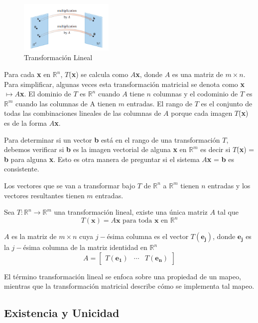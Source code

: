 \documentclass{article}
\begin{document}
\begin{figure}[ht]
    \centerline{\includegraphics[width=0.4\textwidth]{image16.png}}
    \caption{Transformación Lineal}
  \end{figure}

Para cada \textbf{x} en $\mathbb{R}^n$, $T$(\textbf{x}) se calcula como $A$\textbf{x}, donde $A$ es una matriz de $m \times n$. Para simplificar, algunas veces esta transformación matricial se denota como \textbf{x} $\longmapsto A$\textbf{x}. El dominio de $T$ es $\mathbb{R}^n$ cuando $A$ tiene $n$ columnas y el codominio de $T$ es $\mathbb{R}^m$ cuando las columnas de A tienen $m$ entradas. El rango de $T$ es el conjunto de todas las combinaciones lineales de las columnas de $A$ porque cada imagen $T$(\textbf{x}) es de la forma $A$\textbf{x}.

Para determinar si un vector \textbf{b} está en el rango de una transformación $T$, debemos verificar si \textbf{b} es la imagen vectorial de alguna \textbf{x} en $\mathbb{R}^m$ es decir si $T$(\textbf{x}) = \textbf{b} para alguna \textbf{x}. Esto es otra manera de preguntar si el sistema $A$\textbf{x} = \textbf{b} es consistente.

Los vectores que se van a transformar bajo $T$ de $\mathbb{R}^n$ a $\mathbb{R}^m$ tienen $n$ entradas y los vectores resultantes tienen $m$ entradas.

Sea $T: \mathbb{R}^n \rightarrow \mathbb{R}^m$ una transformación lineal, existe una única matriz $A$ tal que $$T(\mathbf{x}) = A\mathbf{x} \text{ para toda } \textbf{x} \text{ en } \mathbb{R}^n$$
    
$A$ es la matriz de $m \times n$ cuya $j-$ésima columna es el vector $T(\mathbf{e_j})$, donde $\mathbf{e_j}$ es la $j-$ésima columna de la matriz identidad en $\mathbb{R}^n$ $$A = \begin{bmatrix}
        T(\mathbf{e_1}) &\dotsb &T(\mathbf{e_n})
    \end{bmatrix}$$

El término transformación lineal se enfoca sobre una propiedad de un mapeo, mientras que la transformación matricial describe cómo se implementa tal mapeo.

\subsection{Existencia y Unicidad}
\end{document}
